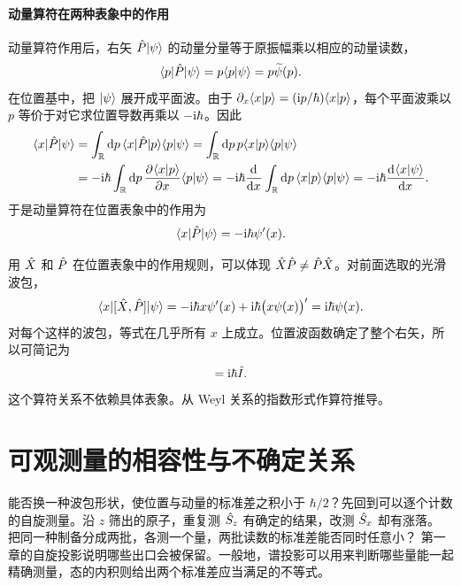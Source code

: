 \paragraph{动量算符在两种表象中的作用}
动量算符作用后，右矢 $\hat{P}\lvert\psi\rangle$ 的动量分量等于原振幅乘以相应的动量读数，
\begin{equation}
    \langle p\vert\hat{P}\vert\psi\rangle = p\langle p\vert\psi\rangle = p\widetilde\psi(p).
\end{equation}
在位置基中，把 $\lvert\psi\rangle$ 展开成平面波。由于 $\partial_x\langle x\vert p\rangle = (\mathrm{i} p/\hbar)\langle x\vert p\rangle$，每个平面波乘以 $p$ 等价于对它求位置导数再乘以 $-\mathrm{i}\hbar$。因此
\begin{equation}
    \label{eq:momentum-position-derivation}
    \begin{aligned}
        \langle x\vert\hat{P}\vert\psi\rangle
        &= \int_{\mathbb{R}}\mathop{}\!\mathrm{d} p\,\langle x\vert\hat{P}\vert p\rangle\langle p\vert\psi\rangle
         = \int_{\mathbb{R}}\mathop{}\!\mathrm{d} p\,p\langle x\vert p\rangle\langle p\vert\psi\rangle\\
        &= -\mathrm{i}\hbar\int_{\mathbb{R}}\mathop{}\!\mathrm{d} p\,\frac{\partial^{}\langle x\vert p\rangle}{\partial{x}^{}}\langle p\vert\psi\rangle
         = -\mathrm{i}\hbar\frac{\mathop{}\!\mathrm{d}^{}}{\mathrm{d}{x}^{}}\int_{\mathbb{R}}\mathop{}\!\mathrm{d} p\,\langle x\vert p\rangle\langle p\vert\psi\rangle = -\mathrm{i}\hbar\frac{\mathop{}\!\mathrm{d}^{}\langle x\vert\psi\rangle}{\mathrm{d}{x}^{}}.
    \end{aligned}
\end{equation}
于是动量算符在位置表象中的作用为
\begin{equation}
    \langle x\vert\hat{P}\vert\psi\rangle = -\mathrm{i}\hbar\psi'(x).
    \label{eq:momentum-position}
\end{equation}

用 $\hat{X}$ 和 $\hat{P}$ 在位置表象中的作用规则，可以体现 $\hat{X}\hat{P} \neq \hat{P}\hat{X}$。对前面选取的光滑波包，
\begin{equation}\label{eq:canonical-position-momentum}
    \langle x\vert[\hat{X},\hat{P}]\vert\psi\rangle
    = -\mathrm{i}\hbar x\psi'(x) + \mathrm{i}\hbar\bigl(x\psi(x)\bigr)'
    = \mathrm{i}\hbar\psi(x).
\end{equation}
对每个这样的波包，等式在几乎所有 $x$ 上成立。位置波函数确定了整个右矢，所以可简记为
\begin{equation}
    [\op X,\op P] = \i\hbar\one.
\end{equation}
这个算符关系不依赖具体表象。从 Weyl 关系的指数形式作算符推导。

\section{可观测量的相容性与不确定关系}
能否换一种波包形状，使位置与动量的标准差之积小于 $\hbar/2$？先回到可以逐个计数的自旋测量。沿 $z$ 筛出的原子，重复测 $\hat{S}_z$ 有确定的结果，改测 $\hat{S}_x$ 却有涨落。
把同一种制备分成两批，各测一个量，两批读数的标准差能否同时任意小？
第一章的自旋投影说明哪些出口会被保留。一般地，谱投影可以用来判断哪些量能一起精确测量，态的内积则给出两个标准差应当满足的不等式。

